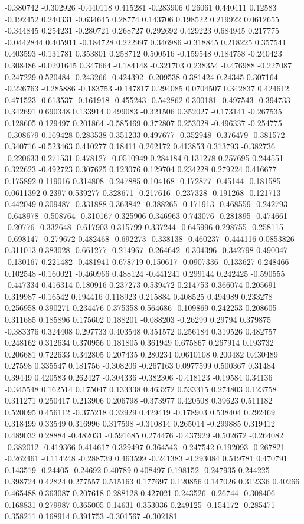 -0.380742 -0.302926 -0.440118 0.415281 -0.283906 0.26061 0.440411 0.12583 -0.192452 0.240331 -0.634645 0.28774 0.143706 0.198522 0.219922 0.0612655 -0.344845 0.254231 -0.280721 0.268727 0.292692 0.429223 0.684945 0.217775 -0.0442844 0.405911 -0.184728 0.222997 0.346986 -0.318845 0.218225 0.357541 0.403593 -0.131781 0.353801 0.258712 0.500516 -0.159548 0.184758 -0.240423 0.308486 -0.0291645 0.347664 -0.184148 -0.321703 0.238354 -0.476988 -0.227087 0.247229 0.520484 -0.243266 -0.424392 -0.209538 0.381424 0.24345 0.307164 -0.226763 -0.285886 -0.183753 -0.147817 0.294085 0.0704507 0.342837 0.424612 0.471523 -0.613537 -0.161918 -0.455243 -0.542862 0.300181 -0.497543 -0.394733 0.342691 0.690348 0.133914 0.499083 -0.321506 0.352027 -0.173141 -0.267535 0.128605 0.129497 0.201864 -0.585469 0.372807 0.253028 -0.496337 -0.254775 -0.308679 0.169428 0.283538 0.351233 0.497677 -0.352948 -0.376479 -0.381572 0.340716 -0.523463 0.410277 0.18411 0.262172 0.413853 0.313793 -0.382736 -0.220633 0.271531 0.478127 -0.0510949 0.284184 0.131278 0.257695 0.244551 0.322623 -0.492723 0.307625 0.123076 0.129704 0.234228 0.279224 0.416677 0.175892 0.119016 0.314808 -0.247885 0.104168 -0.172877 -0.45144 -0.181585 0.0611392 0.2397 0.539277 0.328671 -0.217616 -0.237328 -0.191268 -0.121713 0.442049 0.309487 -0.331888 0.363842 -0.388265 -0.171913 -0.468559 -0.242793 -0.648978 -0.508764 -0.310167 0.325906 0.346963 0.743076 -0.281895 -0.474661 -0.20776 -0.332648 -0.617903 0.315799 0.337244 -0.645996 0.298755 -0.258115 -0.698147 -0.279672 0.482468 -0.692273 -0.338138 -0.460237 -0.444116 0.0853826 0.311013 0.383028 -0.661277 -0.214967 -0.264642 -0.304396 -0.342798 0.490047 -0.130167 0.221482 -0.481941 0.678719 0.150617 -0.0907336 -0.133627 0.248466 0.102548 -0.160021 -0.460966 0.488124 -0.441241 0.299144 0.242425 -0.590555 -0.447334 0.416314 0.180916 0.237273 0.539472 0.214753 0.366074 0.205691 0.319987 -0.16542 0.194416 0.118923 0.215884 0.408525 0.494989 0.233278 0.256958 0.390271 0.234476 0.375358 0.564686 -0.109869 0.242253 0.208605 0.311685 0.185896 0.175602 0.188201 -0.088203 -0.26299 0.29794 0.379875 -0.383376 0.324408 0.297733 0.403548 0.351572 0.256184 0.319526 0.482757 0.248162 0.312634 0.370956 0.181805 0.361949 0.675867 0.267914 0.193732 0.206681 0.722633 0.342805 0.207435 0.280234 0.0610108 0.200482 0.430489 0.27598 0.335547 0.181756 -0.308206 -0.267163 0.0977599 0.500367 0.31484 0.39449 0.420583 0.262427 -0.304336 -0.382306 -0.418123 -0.19584 0.34136 -0.345548 0.162514 0.175047 0.133338 0.463272 0.533315 0.274803 0.123758 0.311271 0.250417 0.213906 0.206798 -0.373977 0.420508 0.39623 0.511182 0.520095 0.456112 -0.375218 0.32929 0.429419 -0.178903 0.538404 0.292469 0.318499 0.33549 0.316996 0.317598 -0.310814 0.265014 -0.299885 0.319412 0.489032 0.28884 -0.482031 -0.591685 0.274476 -0.437929 -0.502672 -0.264082 -0.382012 -0.419366 0.414617 0.329497 0.364543 -0.247542 0.192093 -0.267821 -0.262461 -0.114248 -0.288739 0.463599 -0.241383 -0.293084 0.519781 0.470791 0.143519 -0.24405 -0.24692 0.40789 0.408497 0.198152 -0.247935 0.244225 0.398724 0.42824 0.277557 0.515163 0.177697 0.120856 0.147026 0.312336 0.40266 0.465488 0.363087 0.207618 0.288128 0.427021 0.243526 -0.26744 -0.308406 0.168831 0.279987 0.365005 0.14631 0.353036 0.249125 -0.154172 -0.285471 0.358211 0.168914 0.391753 -0.301567 -0.302181 